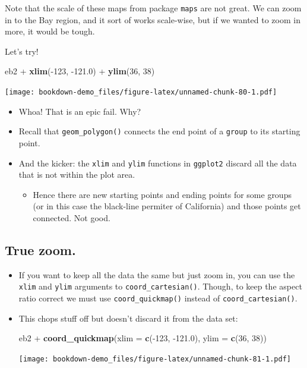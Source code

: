 \documentclass[]{book}
\newenvironment{Shaded}{\begin{snugshade}}{\end{snugshade}}
\newcommand{\KeywordTok}[1]{\textcolor[rgb]{0.13,0.29,0.53}{\textbf{{#1}}}}
\newcommand{\DataTypeTok}[1]{\textcolor[rgb]{0.13,0.29,0.53}{{#1}}}
\newcommand{\DecValTok}[1]{\textcolor[rgb]{0.00,0.00,0.81}{{#1}}}
\newcommand{\FloatTok}[1]{\textcolor[rgb]{0.00,0.00,0.81}{{#1}}}
\newcommand{\StringTok}[1]{\textcolor[rgb]{0.31,0.60,0.02}{{#1}}}
\newcommand{\NormalTok}[1]{{#1}}
\providecommand{\tightlist}{%
  \setlength{\itemsep}{0pt}\setlength{\parskip}{0pt}}
\theoremstyle{definition}
\theoremstyle{definition}
\theoremstyle{remark}
\begin{document}
Note that the scale of these maps from package \texttt{maps} are not
great. We can zoom in to the Bay region, and it sort of works
scale-wise, but if we wanted to zoom in more, it would be tough.

Let's try!

\begin{Shaded}
\begin{Highlighting}[]
\NormalTok{eb2 +}\StringTok{ }\KeywordTok{xlim}\NormalTok{(-}\DecValTok{123}\NormalTok{, -}\FloatTok{121.0}\NormalTok{) +}\StringTok{ }\KeywordTok{ylim}\NormalTok{(}\DecValTok{36}\NormalTok{, }\DecValTok{38}\NormalTok{)}
\end{Highlighting}
\end{Shaded}

\texttt{[image: bookdown-demo\_files/figure-latex/unnamed-chunk-80-1.pdf]}

\begin{itemize}
\tightlist
\item
  Whoa! That is an epic fail. Why?
\item
  Recall that \texttt{geom\_polygon()} connects the end point of a
  \texttt{group} to its starting point.
\item
  And the kicker: the \texttt{xlim} and \texttt{ylim} functions in
  \texttt{ggplot2} discard all the data that is not within the plot
  area.

  \begin{itemize}
  \tightlist
  \item
    Hence there are new starting points and ending points for some
    groups (or in this case the black-line permiter of California) and
    those points get connected. Not good.
  \end{itemize}
\end{itemize}

\subsection{True zoom.}\label{true-zoom.}

\begin{itemize}
\item
  If you want to keep all the data the same but just zoom in, you can
  use the \texttt{xlim} and \texttt{ylim} arguments to
  \texttt{coord\_cartesian()}. Though, to keep the aspect ratio correct
  we must use \texttt{coord\_quickmap()} instead of
  \texttt{coord\_cartesian()}.
\item
  This chops stuff off but doesn't discard it from the data set:

\begin{Shaded}
\begin{Highlighting}[]
\NormalTok{eb2 +}\StringTok{ }\KeywordTok{coord_quickmap}\NormalTok{(}\DataTypeTok{xlim =} \KeywordTok{c}\NormalTok{(-}\DecValTok{123}\NormalTok{, -}\FloatTok{121.0}\NormalTok{),  }\DataTypeTok{ylim =} \KeywordTok{c}\NormalTok{(}\DecValTok{36}\NormalTok{, }\DecValTok{38}\NormalTok{))}
\end{Highlighting}
\end{Shaded}

  \texttt{[image: bookdown-demo\_files/figure-latex/unnamed-chunk-81-1.pdf]}
\end{itemize}
\end{document}
